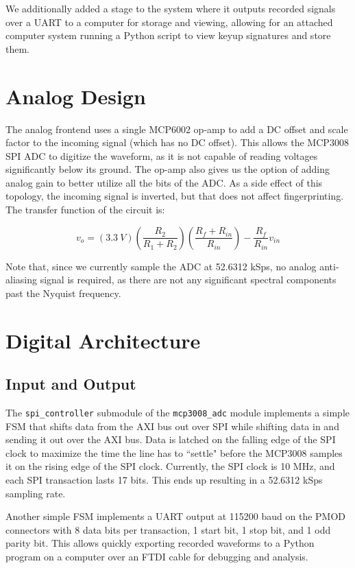 \documentclass[conference]{IEEEtran}
\begin{document}
We additionally added a stage to the system where it outputs recorded signals over a UART to a computer for storage and viewing, allowing for an attached computer system running a Python script to view keyup signatures and store them.

\section{Analog Design}

The analog frontend uses a single MCP6002 op-amp to add a DC offset and scale factor to the incoming signal (which has no DC offset). This allows the MCP3008 SPI ADC to digitize the waveform, as it is not capable of reading voltages significantly below its ground. The op-amp also gives us the option of adding analog gain to better utilize all the bits of the ADC. As a side effect of this topology, the incoming signal is inverted, but that does not affect fingerprinting. The transfer function of the circuit is:

\begin{equation*}
    v_o = (\SI{3.3}{V}) \left( \frac{R_2}{R_1 + R_2} \right) \left( \frac{R_f + R_{in}}{R_{in}} \right) - \frac{R_f}{R_{in}} v_{in}
\end{equation*}

Note that, since we currently sample the ADC at 52.6312 kSps, no analog anti-aliasing signal is required, as there are not any significant spectral components past the Nyquist frequency.

\section{Digital Architecture}

\subsection{Input and Output}

The \lstinline{spi_controller} submodule of the \lstinline{mcp3008_adc} module implements a simple FSM that shifts data from the AXI bus out over SPI while shifting data in and sending it out over the AXI bus. Data is latched on the falling edge of the SPI clock to maximize the time the line has to ``settle" before the MCP3008 samples it on the rising edge of the SPI clock. Currently, the SPI clock is 10 MHz, and each SPI transaction lasts 17 bits. This ends up resulting in a 52.6312 kSps sampling rate.

Another simple FSM implements a UART output at 115200 baud on the PMOD connectors with 8 data bits per transaction, 1 start bit, 1 stop bit, and 1 odd parity bit. This allows quickly exporting recorded waveforms to a Python program on a computer over an FTDI cable for debugging and analysis.
\end{document}
